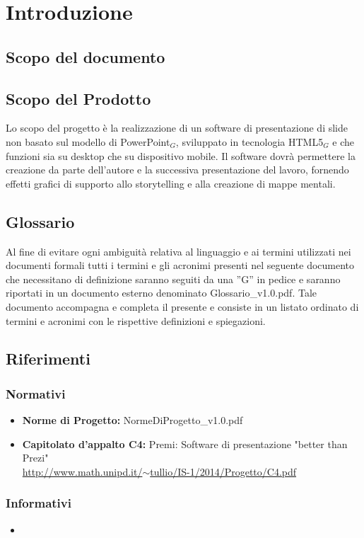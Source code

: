 \section{Introduzione}

\subsection{Scopo del documento}


\subsection{Scopo del Prodotto}
Lo scopo del progetto è la realizzazione di un software di presentazione di slide non basato sul modello di PowerPoint$_{G}$, sviluppato in tecnologia HTML5$_{G}$ e che funzioni sia su desktop che su dispositivo mobile. Il software dovrà permettere la creazione da parte dell'autore e la successiva presentazione del lavoro, fornendo effetti grafici di supporto allo storytelling e alla creazione di mappe mentali. 

\subsection{Glossario}
Al fine di evitare ogni ambiguità relativa al linguaggio e ai termini utilizzati nei documenti formali tutti i termini e gli acronimi presenti nel seguente documento che necessitano di definizione saranno seguiti da una ”G” in pedice e saranno riportati in un documento esterno denominato Glossario\_v1.0.pdf. Tale documento accompagna e completa il presente e consiste in un listato ordinato di termini e acronimi con le rispettive definizioni e spiegazioni.

\subsection{Riferimenti}
\subsubsection{Normativi}
\begin{itemize}
	\item \textbf{Norme di Progetto:} NormeDiProgetto\_v1.0.pdf
	\item \textbf{Capitolato d’appalto C4:} Premi: Software di presentazione "better than Prezi"\\ \href{http://www.math.unipd.it/~tullio/IS-1/2014/Progetto/C4.pdf}{http://www.math.unipd.it/$\sim$tullio/IS-1/2014/Progetto/C4.pdf}
\end{itemize}
\subsubsection{Informativi}
\begin{itemize}
	\item 
\end{itemize}